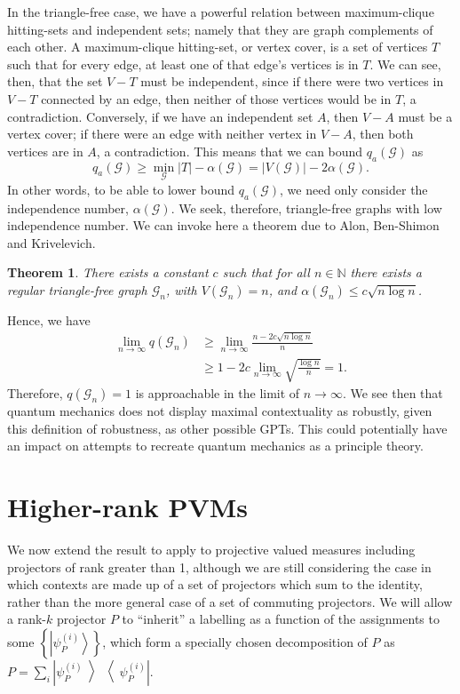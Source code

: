 \documentclass{amsart}
\newtheorem{thm}{Theorem}
\theoremstyle{definition}
\newcommand{\ket}[1]{{\left\vert{#1}\right\rangle}}
\newcommand{\ketbra}[1]{{\left\vert {#1}\middle\rangle\middle\langle{#1}\right\vert}}
\begin{document}
In the triangle-free case, we have a powerful relation between maximum-clique hitting-sets and independent sets; namely that they are graph complements of each other. A maximum-clique hitting-set, or vertex cover, is a set of vertices $T$ such that for every edge, at least one of that edge's vertices is in $T$. We can see, then, that the set $V-T$ must be independent, since if there were two vertices in $V-T$ connected by an edge, then neither of those vertices would be in $T$, a contradiction. Conversely, if we have an independent set $A$, then $V-A$ must be a vertex cover; if there were an edge with neither vertex in $V-A$, then both vertices are in $A$, a contradiction. This means that we can bound $q_a(\mathcal{G})$ as
\begin{equation}
q_a(\mathcal{G})\geq \min_\mathcal{G} |T| - \alpha(\mathcal{G}) = |V(\mathcal{G})|-2\alpha(\mathcal{G}).
\end{equation}
In other words, to be able to lower bound $q_a(\mathcal{G})$, we need only consider the independence number, $\alpha(\mathcal{G})$. We seek, therefore, triangle-free graphs with low independence number. We can invoke here a theorem due to Alon, Ben-Shimon and Krivelevich.\cite{Alon2010}
\begin{thm}
There exists a constant $c$ such that for all $n\in\mathbb{N}$ there exists a regular triangle-free graph $\mathcal{G}_n$, with $V(\mathcal{G}_n)=n$, and $\alpha(\mathcal{G}_n)\leq c\sqrt{n\log n}$.
\end{thm}

Hence, we have
\begin{align}
\lim_{n\rightarrow\infty}q(\mathcal{G}_n)&\geq\lim_{n\rightarrow\infty}\frac{n-2c\sqrt{n\log n}}{n}\\
&\geq 1-2c\lim_{n\rightarrow\infty}\sqrt{\frac{\log n}{n}}=1.
\end{align}
Therefore, $q(\mathcal{G}_n)=1$ is approachable in the limit of $n\rightarrow\infty$. We see then that quantum mechanics does not display maximal contextuality as robustly, given this definition of robustness, as other possible GPTs. This could potentially have an impact on attempts to recreate quantum mechanics as a principle theory.

\FloatBarrier

\section{Higher-rank PVMs}\label{highrank}

We now extend the result to apply to projective valued measures including projectors of rank greater than 1, although we are still considering the case in which contexts are made up of a set of projectors which sum to the identity, rather than the more general case of a set of commuting projectors. We will allow a rank-$k$ projector $P$ to ``inherit'' a labelling as a function of the assignments to some $\left\{\ket{\psi_P^{(i)}}\right\}$, which form a specially chosen decomposition of $P$ as $P=\sum_i \ketbra{\psi_P^{(i)}}$.
\end{document}
